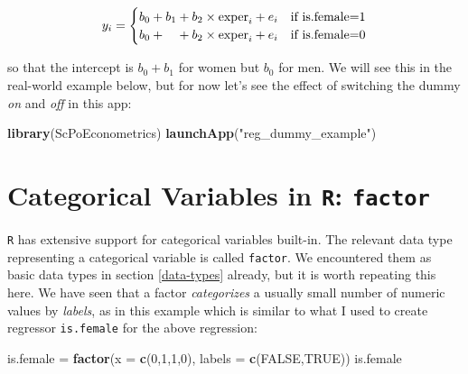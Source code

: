 \documentclass[]{book}
\newenvironment{Shaded}{\begin{snugshade}}{\end{snugshade}}
\newcommand{\KeywordTok}[1]{\textcolor[rgb]{0.13,0.29,0.53}{\textbf{#1}}}
\newcommand{\DataTypeTok}[1]{\textcolor[rgb]{0.13,0.29,0.53}{#1}}
\newcommand{\DecValTok}[1]{\textcolor[rgb]{0.00,0.00,0.81}{#1}}
\newcommand{\StringTok}[1]{\textcolor[rgb]{0.31,0.60,0.02}{#1}}
\newcommand{\OtherTok}[1]{\textcolor[rgb]{0.56,0.35,0.01}{#1}}
\newcommand{\NormalTok}[1]{#1}
\begin{document}
\begin{equation}
y_i =  \begin{cases}
b_0 + b_1 + b_2 \times \text{exper}_i + e_i & \text{if is.female=1} \\
b_0  + \hphantom{b_1} +b_2 \times \text{exper}_i + e_i & \text{if is.female=0}
\end{cases}
\end{equation}

so that the intercept is \(b_0 + b_1\) for women but \(b_0\) for men. We
will see this in the real-world example below, but for now let's see the
effect of switching the dummy \emph{on} and \emph{off} in this app:

\begin{Shaded}
\begin{Highlighting}[]
\KeywordTok{library}\NormalTok{(ScPoEconometrics)}
\KeywordTok{launchApp}\NormalTok{(}\StringTok{"reg_dummy_example"}\NormalTok{)}
\end{Highlighting}
\end{Shaded}

\section{\texorpdfstring{Categorical Variables in \texttt{R}:
\texttt{factor}}{Categorical Variables in R: factor}}\label{categorical-variables-in-r-factor}

\texttt{R} has extensive support for categorical variables built-in. The
relevant data type representing a categorical variable is called
\texttt{factor}. We encountered them as basic data types in section
\ref{data-types} already, but it is worth repeating this here. We have
seen that a factor \emph{categorizes} a usually small number of numeric
values by \emph{labels}, as in this example which is similar to what I
used to create regressor \texttt{is.female} for the above regression:

\begin{Shaded}
\begin{Highlighting}[]
\NormalTok{is.female =}\StringTok{ }\KeywordTok{factor}\NormalTok{(}\DataTypeTok{x =} \KeywordTok{c}\NormalTok{(}\DecValTok{0}\NormalTok{,}\DecValTok{1}\NormalTok{,}\DecValTok{1}\NormalTok{,}\DecValTok{0}\NormalTok{), }\DataTypeTok{labels =} \KeywordTok{c}\NormalTok{(}\OtherTok{FALSE}\NormalTok{,}\OtherTok{TRUE}\NormalTok{))}
\NormalTok{is.female}
\end{Highlighting}
\end{Shaded}
\end{document}
